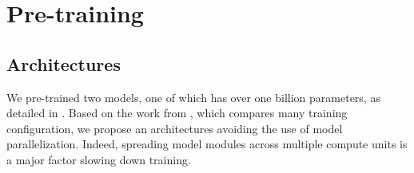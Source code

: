 
\section{Pre-training}







\subsection{Architectures} 

We pre-trained two models, one of which has over one billion parameters, as detailed in . Based on the work from \textcite{shoeybi_19}, which compares many training configuration, we propose an architectures avoiding the use of model parallelization. Indeed, spreading model modules across multiple compute units is a major factor slowing down training.

